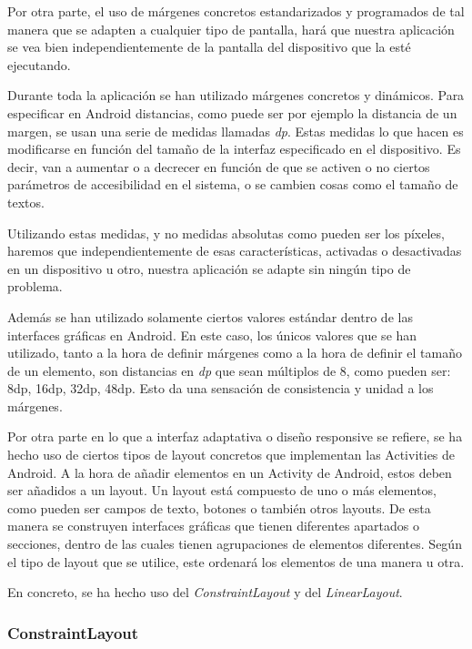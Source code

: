 Por otra parte, el uso de márgenes concretos estandarizados y programados de tal manera que se adapten a cualquier tipo de pantalla, hará que nuestra aplicación se vea bien independientemente de la pantalla del dispositivo que la esté ejecutando.

Durante toda la aplicación se han utilizado márgenes concretos y dinámicos. Para especificar en Android distancias, como puede ser por ejemplo la distancia de un margen,  se usan una serie de medidas llamadas \textit{dp}. Estas medidas lo que hacen es modificarse en función del tamaño de la interfaz especificado en el dispositivo. Es decir, van a aumentar o a decrecer en función de que se activen o no ciertos parámetros de accesibilidad en el sistema, o se cambien cosas como el tamaño de textos.

Utilizando estas medidas, y no medidas absolutas como pueden ser los píxeles, haremos que independientemente de esas características, activadas o desactivadas en un dispositivo u otro, nuestra aplicación se adapte sin ningún tipo de problema.

Además se han utilizado solamente ciertos valores estándar dentro de las interfaces gráficas en Android. En este caso, los únicos valores que se han utilizado, tanto a la hora de definir márgenes como a la hora de definir el tamaño de un elemento, son distancias en \textit{dp} que sean múltiplos de 8, como pueden ser: 8dp, 16dp, 32dp, 48dp. Esto da una sensación de consistencia y unidad a los márgenes.

Por otra parte en lo que a interfaz adaptativa o diseño responsive se refiere, se ha hecho uso de ciertos tipos de layout concretos que implementan las Activities de Android. A la hora de añadir elementos en un Activity de Android, estos deben ser añadidos a un layout. Un layout está compuesto de uno o más elementos, como pueden ser campos de texto, botones o también otros layouts. De esta manera se construyen interfaces gráficas que tienen diferentes apartados o secciones, dentro de las cuales tienen agrupaciones de elementos diferentes. Según el tipo de layout que se utilice, este ordenará los elementos de una manera u otra.

En concreto, se ha hecho uso del \textit{ConstraintLayout} y del \textit{LinearLayout}.

\subsubsection{ConstraintLayout}

